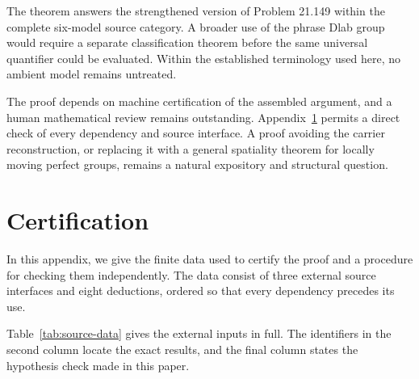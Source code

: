 \documentclass[11pt]{amsart}
\theoremstyle{definition}
\theoremstyle{remark}
\numberwithin{equation}{section}
\begin{document}
The theorem answers the strengthened version of Problem 21.149 within the complete six-model source category. A broader use of the phrase Dlab group would require a separate classification theorem before the same universal quantifier could be evaluated. Within the established terminology used here, no ambient model remains untreated.

The proof depends on machine certification of the assembled argument, and a human mathematical review remains outstanding. Appendix~\ref{app:certification} permits a direct check of every dependency and source interface. A proof avoiding the carrier reconstruction, or replacing it with a general spatiality theorem for locally moving perfect groups, remains a natural expository and structural question.

\appendix

\section{Certification}
\label{app:certification}

In this appendix, we give the finite data used to certify the proof and a procedure for checking them independently. The data consist of three external source interfaces and eight deductions, ordered so that every dependency precedes its use.

Table~\ref{tab:source-data} gives the external inputs in full. The identifiers in the second column locate the exact results, and the final column states the hypothesis check made in this paper.
\end{document}
